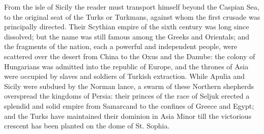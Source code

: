 From the isle of Sicily the reader must transport himself beyond the Caspian Sea, to the original seat of the Turks or Turkmans, against whom the first crusade was principally directed. Their Scythian empire of the sixth century was long since dissolved; but the name was still famous among the Greeks and Orientals; and the fragments of the nation, each a powerful and independent people, were scattered over the desert from China to the Oxus and the Danube: the colony of Hungarians was admitted into the republic of Europe, and the thrones of Asia were occupied by slaves and soldiers of Turkish extraction. While Apulia and Sicily were subdued by the Norman lance, a swarm of these Northern shepherds overspread the kingdoms of Persia: their princes of the race of Seljuk erected a splendid and solid empire from Samarcand to the confines of Greece and Egypt; and the Turks have maintained their dominion in Asia Minor till the victorious crescent has been planted on the dome of St. Sophia.

